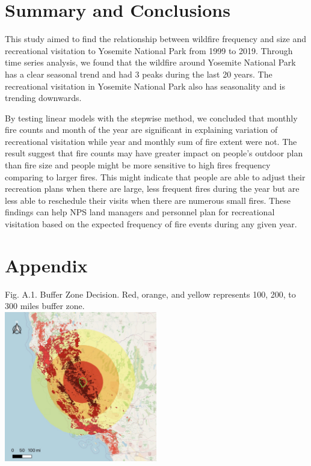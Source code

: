 \documentclass[
  12pt,
]{article}
\begin{document}
\newpage

\hypertarget{summary-and-conclusions}{%
\section{Summary and Conclusions}\label{summary-and-conclusions}}

This study aimed to find the relationship between wildfire frequency and size and recreational visitation to Yosemite National Park from 1999 to 2019. Through time series analysis, we found that the wildfire around Yosemite National Park has a clear seasonal trend and had 3 peaks during the last 20 years. The recreational visitation in Yosemite National Park also has seasonality and is trending downwards.

By testing linear models with the stepwise method, we concluded that monthly fire counts and month of the year are significant in explaining variation of recreational visitation while year and monthly sum of fire extent were not. The result suggest that fire counts may have greater impact on people's outdoor plan than fire size and people might be more sensitive to high fires frequency comparing to larger fires. This might indicate that people are able to adjust their recreation plans when there are large, less frequent fires during the year but are less able to reschedule their visits when there are numerous small fires. These findings can help NPS land managers and personnel plan for recreational visitation based on the expected frequency of fire events during any given year.

\newpage

\hypertarget{appendix}{%
\section{Appendix}\label{appendix}}

Fig. A.1. Buffer Zone Decision. Red, orange, and yellow represents 100, 200, to 300 miles buffer zone.\\
\includegraphics[width=0.5\textwidth,height=\textheight]{Output/buffer.JPG}
\end{document}
